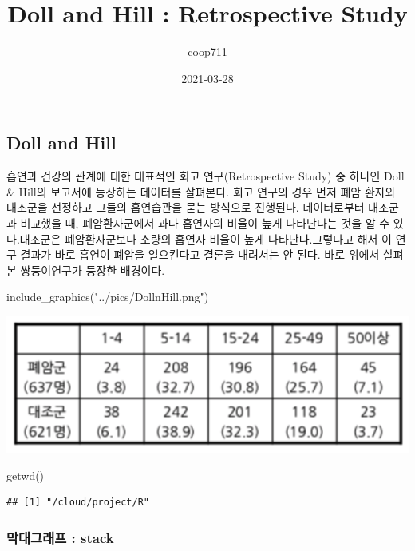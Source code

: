 \documentclass[
]{article}
\title{Doll and Hill : Retrospective Study}
\author{coop711}
\date{2021-03-28}
\newenvironment{Shaded}{\begin{snugshade}}{\end{snugshade}}
\newcommand{\FunctionTok}[1]{\textcolor[rgb]{0.00,0.00,0.00}{#1}}
\newcommand{\NormalTok}[1]{#1}
\newcommand{\StringTok}[1]{\textcolor[rgb]{0.31,0.60,0.02}{#1}}
\begin{document}
\maketitle

\hypertarget{doll-and-hill}{%
\subsection{Doll and Hill}\label{doll-and-hill}}

흡연과 건강의 관계에 대한 대표적인 회고 연구(Retrospective Study) 중
하나인 Doll \& Hill의 보고서에 등장하는 데이터를 살펴본다. 회고 연구의
경우 먼저 폐암 환자와 대조군을 선정하고 그들의 흡연습관을 묻는 방식으로
진행된다. 데이터로부터 대조군과 비교했을 때, 폐암환자군에서 과다
흡연자의 비율이 높게 나타난다는 것을 알 수 있다.대조군은 폐암환자군보다
소량의 흡연자 비율이 높게 나타난다.그렇다고 해서 이 연구 결과가 바로
흡연이 폐암을 일으킨다고 결론을 내려서는 안 된다. 바로 위에서 살펴본
쌍둥이연구가 등장한 배경이다.

\begin{Shaded}
\begin{Highlighting}[]
\FunctionTok{include\_graphics}\NormalTok{(}\StringTok{"../pics/DollnHill.png"}\NormalTok{)}
\end{Highlighting}
\end{Shaded}

\begin{flushleft}\includegraphics[width=0.35\linewidth]{../pics/DollnHill} \end{flushleft}

\begin{Shaded}
\begin{Highlighting}[]
\FunctionTok{getwd}\NormalTok{()}
\end{Highlighting}
\end{Shaded}

\begin{verbatim}
## [1] "/cloud/project/R"
\end{verbatim}

\hypertarget{uxb9c9uxb300uxadf8uxb798uxd504-stack}{%
\subsubsection{막대그래프 :
stack}\label{uxb9c9uxb300uxadf8uxb798uxd504-stack}}
\end{document}
